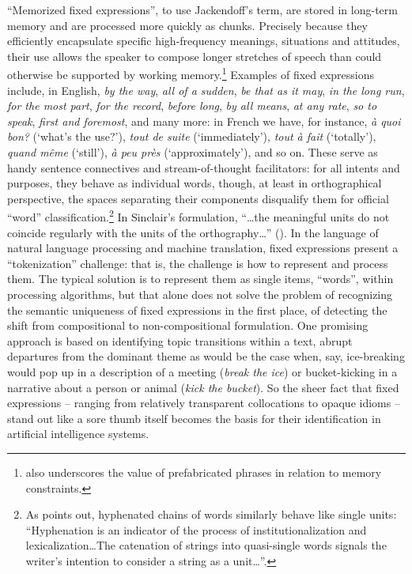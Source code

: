 \documentclass[output=paper]{langsci/langscibook}
\begin{document}
``Memorized fixed expressions'', to use Jackendoff’s term, are stored in long-term memory and are processed more quickly as chunks. Precisely because they efficiently encapsulate specific high-frequency meanings, situations and attitudes, their use allows the speaker to compose longer stretches of speech than could otherwise be supported by working memory.\footnote{\citet{bolinger_meaning_1976} also underscores the value of prefabricated phrases in relation to memory constraints.} Examples of fixed expressions include, in English, \textit{by the way}, \textit{all of a sudden}, \textit{be that as it may}, \textit{in the long run}, \textit{for the most part}, \textit{for the record}, \textit{before long}, \textit{by all means}, \textit{at any rate}, \textit{so to speak}, \textit{first and foremost}, and many more: in French we have, for instance, \textit{à quoi bon?} (`what’s the use?'), \textit{tout de suite} (`immediately'), \textit{tout à fait} (`totally'), \textit{quand même} (`still'), \textit{à peu près} (`approximately'), and so on. These serve as handy sentence connectives and stream-of-thought facilitators: for all intents and purposes, they behave as individual words, though, at least in orthographical perspective, the spaces separating their components disqualify them for official ``word'' classification.\footnote{As \citet[43]{moon_fixed_1998} points out, hyphenated chains of words similarly behave like single units: “Hyphenation is an indicator of the process of institutionalization and lexicalization…The catenation of strings into quasi-single words signals the writer’s intention to consider a string as a unit…”.} In Sinclair’s formulation, “…the meaningful units do not coincide regularly with the units of the orthography…” (\citeyear[410]{granger_phrase_2008}). In the language of natural language processing and machine translation, fixed expressions present a ``tokenization'' challenge: that is, the challenge is how to represent and process them. The typical solution is to represent them as single items, ``words'', within processing algorithms, but that alone does not solve the problem of recognizing the semantic uniqueness of fixed expressions in the first place, of detecting the shift from compositional to non-compositional formulation. One promising approach is based on identifying topic transitions within a text, abrupt departures from the dominant theme as would be the case when, say, ice-breaking would pop up in a description of a meeting (\textit{break the ice}) or bucket-kicking in a narrative about a person or animal (\textit{kick the bucket}). So the sheer fact that fixed expressions – ranging from relatively transparent collocations to opaque idioms – stand out like a sore thumb itself becomes the basis for their identification in artificial intelligence systems.
\end{document}
